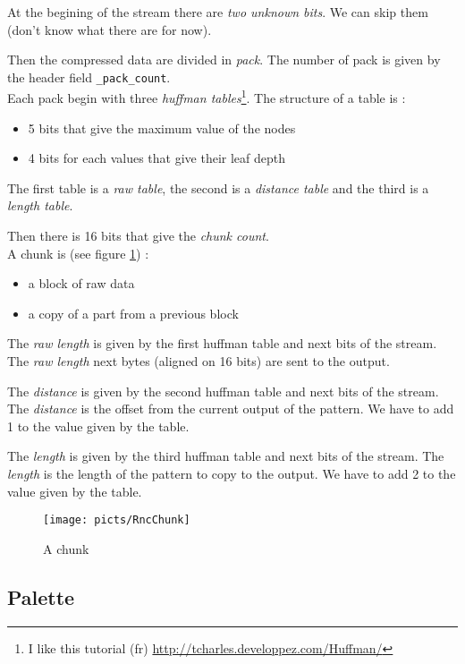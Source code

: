 \documentclass[a4paper,twoside,12pt,dvips]{article}
\begin{document}
At the begining of the stream there are \emph{two unknown bits}. We can skip them (don't know what there are for now).

Then the compressed data are divided in \emph{pack}. The number of pack is given by the header field \texttt{\_pack\_count}.\\
Each pack begin with three \emph{huffman tables}\footnote{I like this tutorial (fr) \href{http://tcharles.developpez.com/Huffman/}{http://tcharles.developpez.com/Huffman/}}. The structure of a table is :
\begin{itemize}
\item 5 bits that give the maximum value of the nodes
\item 4 bits for each values that give their leaf depth
\end{itemize}
The first table is a \emph{raw table}, the second is a \emph{distance table} and the third is a \emph{length table}.

Then there is 16 bits that give the \emph{chunk count}.\\
A chunk is (see figure \ref{fig:rncchunk}) :
\begin{itemize}
\item a block of raw data
\item a copy of a part from a previous block
\end{itemize}

The \emph{raw length} is given by the first huffman table and next bits of the stream. The \emph{raw length} next bytes (aligned on 16 bits) are sent to the output.

The \emph{distance} is given by the second huffman table and next bits of the stream. The \emph{distance} is the offset from the current output of the pattern. We have to add 1 to the value given by the table.

The \emph{length} is given by the third huffman table and next bits of the stream. The \emph{length} is the length of the pattern to copy to the output. We have to add 2 to the value given by the table.

\begin{figure}[htbp]
  \texttt{[image: picts/RncChunk]}\centering 
  \caption{A chunk}
  \label{fig:rncchunk}
\end{figure}


\subsection{Palette}
\label{sec:palette}
\end{document}
